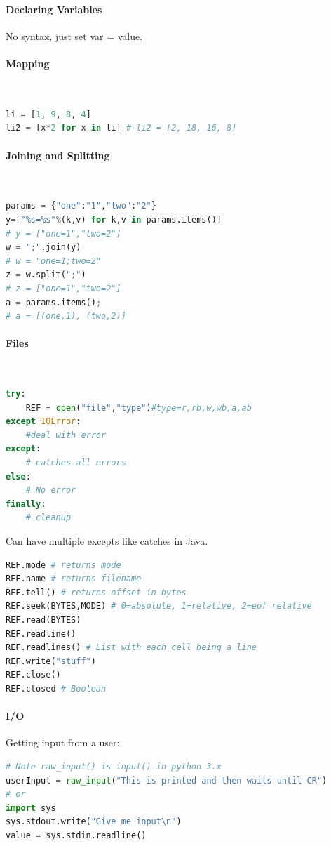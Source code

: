 \documentclass[12 pt]{article}
\begin{document}
\paragraph{Declaring Variables} No syntax, just set var = value. 
\paragraph{Mapping}~
\begin{lstlisting}[language=python]
li = [1, 9, 8, 4]
li2 = [x*2 for x in li] # li2 = [2, 18, 16, 8]
\end{lstlisting}
\paragraph{Joining and Splitting}~
\begin{lstlisting}[language=python]
params = {"one":"1","two":"2"}
y=["%s=%s"%(k,v) for k,v in params.items()]
# y = ["one=1","two=2"]
w = ";".join(y)
# w = "one=1;two=2"
z = w.split(";")
# z = ["one=1","two=2"]
a = params.items();
# a = [(one,1), (two,2)]
\end{lstlisting}
\paragraph{Files}~
\begin{lstlisting}[language=python]
try:
    REF = open("file","type")#type=r,rb,w,wb,a,ab
except IOError:
    #deal with error
except:
    # catches all errors
else: 
    # No error
finally:
    # cleanup
\end{lstlisting}
Can have multiple excepts like catches in Java.
\begin{lstlisting}[language=python]
REF.mode # returns mode
REF.name # returns filename
REF.tell() # returns offset in bytes
REF.seek(BYTES,MODE) # 0=absolute, 1=relative, 2=eof relative
REF.read(BYTES)
REF.readline()
REF.readlines() # List with each cell being a line
REF.write("stuff")
REF.close()
REF.closed # Boolean
\end{lstlisting}
\paragraph{I/O}
Getting input from a user:
\begin{lstlisting}[language=python]
# Note raw_input() is input() in python 3.x
userInput = raw_input("This is printed and then waits until CR")
# or
import sys
sys.stdout.write("Give me input\n")
value = sys.stdin.readline()
\end{lstlisting}
\end{document}
